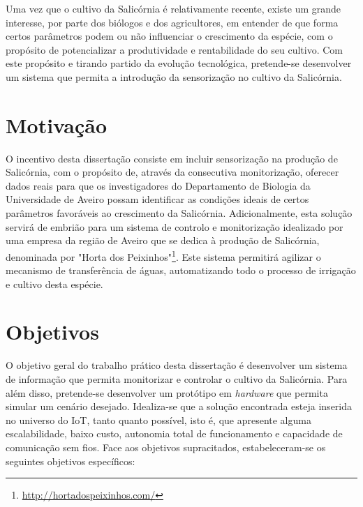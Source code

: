 Uma vez que o cultivo da Salicórnia é relativamente recente, existe um grande interesse, por parte dos biólogos e dos agricultores, em entender de que forma certos parâmetros podem ou não influenciar o crescimento da espécie, com o propósito de potencializar a produtividade e rentabilidade do seu cultivo. Com este propósito e tirando partido da evolução tecnológica, pretende-se desenvolver um sistema que permita a introdução da sensorização no cultivo da Salicórnia.     


\section{Motivação}

O incentivo desta dissertação consiste em incluir sensorização na produção de Salicórnia, com o propósito de, através da consecutiva monitorização, oferecer dados reais para que os investigadores do Departamento de Biologia da Universidade de Aveiro possam identificar as condições ideais de certos parâmetros favoráveis ao crescimento da Salicórnia. Adicionalmente, esta solução servirá de embrião para um sistema de controlo e monitorização idealizado por uma empresa da região de Aveiro que se dedica à produção de Salicórnia, denominada por "Horta dos Peixinhos"\footnote{\url{http://hortadospeixinhos.com/}}. Este sistema permitirá agilizar o mecanismo de transferência de águas, automatizando todo o processo de irrigação e cultivo desta espécie. 









\section{Objetivos}
\label{objectivos}



O objetivo geral do trabalho prático desta dissertação é desenvolver um sistema de informação que permita monitorizar e controlar o cultivo da Salicórnia. Para além disso, pretende-se desenvolver um protótipo em \textit{hardware} que permita  simular um cenário desejado. Idealiza-se que a solução encontrada esteja inserida no universo do \ac{IoT}, tanto quanto possível, isto é, que apresente alguma escalabilidade, baixo custo, autonomia total de funcionamento e capacidade de comunicação sem fios. Face aos objetivos supracitados, estabeleceram-se os seguintes objetivos específicos:




